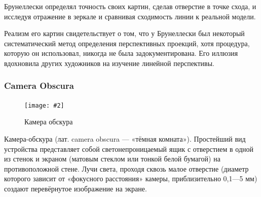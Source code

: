 \documentclass[a4paper, 14pt]{extarticle}
\newcommand{\screenshot}[3]{
	\begin{figure}[h]
		\centering
		\texttt{[image: \#2]}
		\caption{#3}
	\end{figure}
}
\begin{document}
Брунеллески определял точность своих картин, сделав отверстие в точке схода, и исследуя отражение в зеркале и сравнивая сходимость линии к реальной модели. 

Реализм его картин свидетельствует о том, что у Брунеллески был некоторый систематический метод определения перспективных проекций, хотя процедура, которую он использовал, никогда не была задокументирована. Его иллюзия вдохновила других художников на изучение линейной перспективы.

\FloatBarrier
\subsubsection{Camera Obscura}
\screenshot{width=9cm}{l5/S008.jpg}{Камера обскура}
Камера-обскура (лат. camera obscura — «тёмная комната»). Простейший вид устройства представляет собой светонепроницаемый ящик с отверстием в одной из стенок и экраном (матовым стеклом или тонкой белой бумагой) на противоположной стене. Лучи света, проходя сквозь малое отверстие (диаметр которого зависит от «фокусного расстояния» камеры, приблизительно 0,1—5 мм) создают перевёрнутое изображение на экране.
\end{document}
